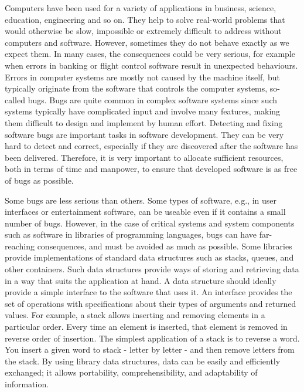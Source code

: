 
Computers have been used for a variety of applications in business, science, education, engineering and so on. They help to solve real-world problems that would otherwise be slow, impossible or extremely difficult to address without computers and software. However, sometimes they do not behave exactly as we expect them. In many cases, the consequences could be very serious, for example when errors in banking or flight control software result in unexpected behaviours. Errors in computer systems are mostly not caused by the machine itself, but typically originate from the software that controls the computer systems, so-called bugs. Bugs are quite common in complex software systems since such systems typically have complicated input and involve many features, making them difficult to design and implement by human effort. Detecting and fixing software bugs are important tasks in software development. They can be very hard to detect and correct, especially if they are discovered after the software has been delivered. Therefore, it is very important to allocate sufficient resources, both in terms of time and manpower, to ensure that developed software is as free of bugs as possible. 

Some bugs are less serious than others. Some types of software, e.g., in user interfaces or entertainment software, can be useable even if it contains a small number of bugs.
However, in the case of critical systems and system components such as software in libraries of programming languages, 
bugs can have far-reaching consequences, and must be avoided as much as possible.
Some libraries provide implementations of standard data structures such as stacks, queues, and other containers. Such data structures provide ways of storing  
and retrieving data in a way that suits the application at hand. A data structure should ideally provide a simple interface to the software that uses it. An interface provides the set of operations with specifications about their types of arguments and returned values. For example, a stack allows inserting and removing elements in a particular order. Every time an element is inserted, that element is removed
in reverse order of insertion. The simplest application of a stack is to reverse a word. You insert a given word to stack - letter by letter - and then remove letters from the stack.
By using library data structures, data can be easily and efficiently exchanged; it allows portability, comprehensibility, and adaptability of information.

